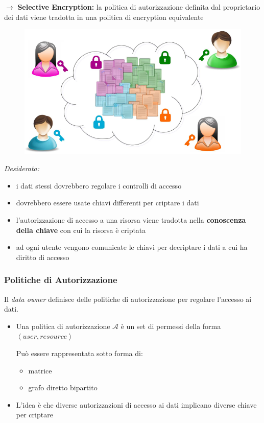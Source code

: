 \documentclass{report}
\begin{document}
$\rightarrow$ \textbf{Selective Encryption:} la politica di autorizzazione definita dal proprietario dei dati 
viene tradotta in una politica di encryption equivalente

\begin{figure}[ht]
    \centering
    \includegraphics[width=0.7\linewidth]{images/encryption/selective.png}
\end{figure}

\textit{Desiderata:}
\begin{itemize}
    \item i dati stessi dovrebbero regolare i controlli di accesso 
    \item dovrebbero essere usate chiavi differenti per criptare i dati 
    \item l'autorizzazione di accesso a una risorsa viene tradotta nella \textbf{conoscenza della chiave} con cui la risorsa è criptata 
    \item ad ogni utente vengono comunicate le chiavi per decriptare i dati a cui ha diritto di accesso
\end{itemize}

\subsubsection{Politiche di Autorizzazione}
Il \textit{data owner} definisce delle politiche di autorizzazione per regolare l'accesso ai dati.

\begin{itemize}
    \item Una politica di autorizzazione $\mathcal{A}$ è un set di permessi della forma $\left\langle user, resource \right\rangle$
    
    \noindent Può essere rappresentata sotto forma di:
    \begin{itemize}
        \item matrice 
        \item grafo diretto bipartito
    \end{itemize}
    \item L'idea è che diverse autorizzazioni di accesso ai dati implicano diverse chiave per criptare 
\end{itemize}
\end{document}
